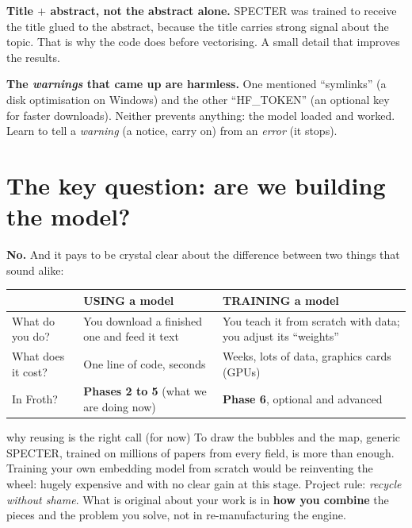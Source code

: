 \documentclass[11pt,a4paper]{article}
\begin{document}
\begin{ojo}
\textbf{Title $+$ abstract, not the abstract alone.} SPECTER was trained to receive the title
glued to the abstract, because the title carries strong signal about the topic. That is why
the code does  before vectorising. A small detail that
improves the results.
\end{ojo}

\begin{ojo}
\textbf{The \emph{warnings} that came up are harmless.} One mentioned ``symlinks'' (a disk
optimisation on Windows) and the other ``HF\_TOKEN'' (an optional key for faster downloads).
Neither prevents anything: the model loaded and worked. Learn to tell a \emph{warning}
(a notice, carry on) from an \emph{error} (it stops).
\end{ojo}

\section{The key question: are we building the model?}

\textbf{No.} And it pays to be crystal clear about the difference between two things that
sound alike:

\begin{center}
\begin{tabular}{p{4.3cm} p{4.3cm} p{4.3cm}}
 & \textbf{USING a model} & \textbf{TRAINING a model} \\[2pt]
\hline
What do you do? & You download a finished one and feed it text & You teach it from scratch with data; you adjust its ``weights'' \\[6pt]
What does it cost? & One line of code, seconds & Weeks, lots of data, graphics cards (GPUs) \\[6pt]
In Froth? & \textbf{Phases 2 to 5} (what we are doing now) & \textbf{Phase 6}, optional and advanced \\
\end{tabular}
\end{center}

\begin{concepto}{why reusing is the right call (for now)}
To draw the bubbles and the map, generic SPECTER, trained on millions of papers from every
field, is more than enough. Training your own embedding model from scratch would be
reinventing the wheel: hugely expensive and with no clear gain at this stage. Project rule:
\emph{recycle without shame}. What is original about your work is in \textbf{how you combine}
the pieces and the problem you solve, not in re-manufacturing the engine.
\end{concepto}
\end{document}
